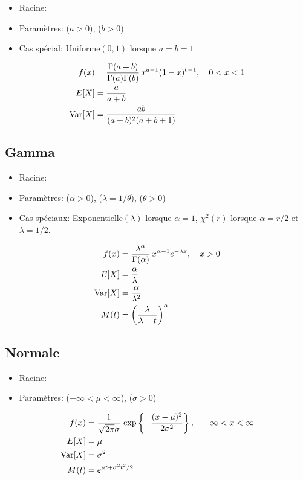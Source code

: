 \begin{itemize}
\item Racine: 
\item Paramètres:  ($a > 0$),
       ($b > 0$)
\end{itemize}
\begin{itemize}
\item Cas spécial: Uniforme$(0, 1)$ lorsque $a = b = 1$.
\end{itemize}
\begin{align*}
  f(x)
  &= \frac{\Gamma(a + b)}{\Gamma(a) \Gamma(b)}\,
  x^{a - 1} (1 - x)^{b - 1}, \quad 0 < x < 1 \\
  E [ X ]
  &= \frac{a}{a + b} \\
  \operatorname{Var} [ X ]
  &= \frac{a b}{(a + b)^2 (a + b + 1)}
\end{align*}


\subsection{Gamma}
\label{distributions:gamma}

\begin{itemize}
\item Racine: 
\item Paramètres:  ($\alpha > 0$),
         ($\lambda = 1/\theta$),
        ($\theta > 0$)
\end{itemize}
\begin{itemize}
\item Cas spéciaux: Exponentielle$(\lambda)$ lorsque $\alpha = 1$,
  $\chi^2(r)$ lorsque $\alpha = r/2$ et $\lambda = 1/2$.
\end{itemize}
\begin{align*}
  f(x)
  &= \frac{\lambda^\alpha}{\Gamma(\alpha)}\, x^{\alpha - 1} e^{-\lambda x},
  \quad x > 0 \\
  E [ X ]
  &= \frac{\alpha}{\lambda} \\
  \operatorname{Var} [ X ]
  &= \frac{\alpha}{\lambda^2} \\
  M(t)
  &= \left( \frac{\lambda}{\lambda - t} \right)^\alpha
\end{align*}


\subsection{Normale}
\label{distributions:normale}
\begin{itemize}
\item Racine: 
\item Paramètres:  ($-\infty < \mu < \infty$), 
  ($\sigma > 0$)
\end{itemize}
\begin{align*}
  f(x)
  &= \frac{1}{\sqrt{2\pi} \sigma}\,
  \exp\left\{ -\frac{(x - \mu)^2}{2\sigma^2} \right\}, \quad
  -\infty < x < \infty \\
  E [ X ]
  &= \mu \\
  \operatorname{Var} [ X ]
  &= \sigma^2 \\
  M(t)
  &= e^{\mu t + \sigma^2 t^2/2}
\end{align*}

